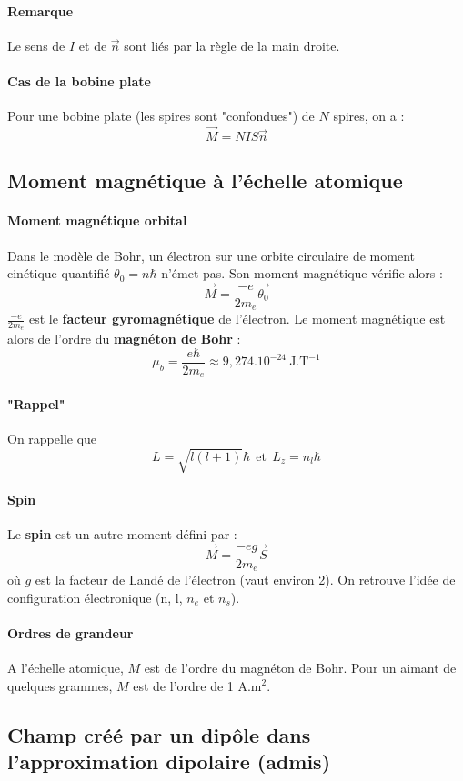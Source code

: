 \documentclass[french]{book}
\theoremstyle{plain}
\theoremstyle{definition}
\theoremstyle{remark}
\newcommand{\inv}{^{-1}}
\begin{document}
\paragraph{Remarque} Le sens de $I$ et de $\overrightarrow{n}$ sont liés par la règle de la main droite.
\paragraph{Cas de la bobine plate} Pour une bobine plate (les spires sont "confondues") de $N$ spires, on a : $$\overrightarrow{M}=NIS\overrightarrow{n}$$
\subsection{Moment magnétique à l'échelle atomique}
\paragraph{Moment magnétique orbital} Dans le modèle de Bohr, un électron sur une orbite circulaire de moment cinétique quantifié $\theta_0=n\hbar$ n'émet pas. Son moment magnétique vérifie alors : $$\overrightarrow{M}=\frac{-e}{2m_e}\overrightarrow{\theta_0}$$ $\displaystyle \frac{-e}{2m_e}$ est le \textbf{facteur gyromagnétique} de l'électron. Le moment magnétique est alors de l'ordre du \textbf{magnéton de Bohr} : $$\mu_b=\frac{e\hbar}{2m_e}\approx 9,274.10^{-24}\ \text{J.T}\inv$$
\paragraph{"Rappel"} On rappelle que $$L=\sqrt{l(l+1)}\hbar \ \ \text{et} \ \ L_z=n_l\hbar$$
\paragraph{Spin} Le \textbf{spin} est un autre moment défini par : $$\overrightarrow{M}=\frac{-eg}{2m_e}\overrightarrow{S}$$ où $g$ est la facteur de Landé de l'électron (vaut environ 2). On retrouve l'idée de configuration électronique (n, l, $n_e$ et $n_s$).
\paragraph{Ordres de grandeur} A l'échelle atomique, $M$ est de l'ordre du magnéton de Bohr. Pour un aimant de quelques grammes, $M$ est de l'ordre de 1 A.m$^2$.
\subsection{Champ créé par un dipôle dans l'approximation dipolaire (admis)}
\end{document}
